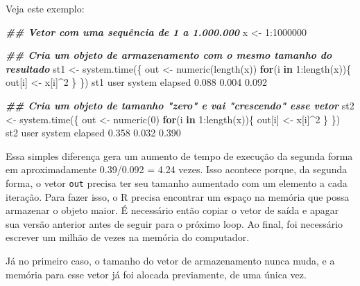 \documentclass[
  10pt,
  a4paper]{book}
\newenvironment{Shaded}{\begin{snugshade}}{\end{snugshade}}
\newcommand{\ControlFlowTok}[1]{\textcolor[rgb]{0.13,0.29,0.53}{\textbf{#1}}}
\newcommand{\DecValTok}[1]{\textcolor[rgb]{0.00,0.00,0.81}{#1}}
\newcommand{\DocumentationTok}[1]{\textcolor[rgb]{0.56,0.35,0.01}{\textbf{\textit{#1}}}}
\newcommand{\FloatTok}[1]{\textcolor[rgb]{0.00,0.00,0.81}{#1}}
\newcommand{\FunctionTok}[1]{\textcolor[rgb]{0.00,0.00,0.00}{#1}}
\newcommand{\NormalTok}[1]{#1}
\newcommand{\OtherTok}[1]{\textcolor[rgb]{0.56,0.35,0.01}{#1}}
\newcommand{\SpecialCharTok}[1]{\textcolor[rgb]{0.00,0.00,0.00}{#1}}
\begin{document}
Veja este exemplo:

\begin{Shaded}
\begin{Highlighting}[]
\DocumentationTok{\#\# Vetor com uma sequência de 1 a 1.000.000}
\NormalTok{x }\OtherTok{\textless{}{-}} \DecValTok{1}\SpecialCharTok{:}\DecValTok{1000000}

\DocumentationTok{\#\# Cria um objeto de armazenamento com o mesmo tamanho do resultado}
\NormalTok{st1 }\OtherTok{\textless{}{-}} \FunctionTok{system.time}\NormalTok{(\{}
\NormalTok{    out }\OtherTok{\textless{}{-}} \FunctionTok{numeric}\NormalTok{(}\FunctionTok{length}\NormalTok{(x))}
    \ControlFlowTok{for}\NormalTok{(i }\ControlFlowTok{in} \DecValTok{1}\SpecialCharTok{:}\FunctionTok{length}\NormalTok{(x))\{}
\NormalTok{        out[i] }\OtherTok{\textless{}{-}}\NormalTok{ x[i]}\SpecialCharTok{\^{}}\DecValTok{2}
\NormalTok{    \}}
\NormalTok{\})}
\NormalTok{st1}
\NormalTok{   user  system elapsed }
  \FloatTok{0.088}   \FloatTok{0.004}   \FloatTok{0.092} 

\DocumentationTok{\#\# Cria um objeto de tamanho "zero" e vai "crescendo" esse vetor}
\NormalTok{st2 }\OtherTok{\textless{}{-}} \FunctionTok{system.time}\NormalTok{(\{}
\NormalTok{    out }\OtherTok{\textless{}{-}} \FunctionTok{numeric}\NormalTok{(}\DecValTok{0}\NormalTok{)}
    \ControlFlowTok{for}\NormalTok{(i }\ControlFlowTok{in} \DecValTok{1}\SpecialCharTok{:}\FunctionTok{length}\NormalTok{(x))\{}
\NormalTok{        out[i] }\OtherTok{\textless{}{-}}\NormalTok{ x[i]}\SpecialCharTok{\^{}}\DecValTok{2}
\NormalTok{    \}}
\NormalTok{\})}
\NormalTok{st2}
\NormalTok{   user  system elapsed }
  \FloatTok{0.358}   \FloatTok{0.032}   \FloatTok{0.390} 
\end{Highlighting}
\end{Shaded}

Essa simples diferença gera um aumento de tempo de execução da segunda
forma em aproximadamente
0.39/0.092 = 4.24 vezes. Isso acontece
porque, da segunda forma, o vetor \texttt{out} precisa ter seu tamanho
aumentado com um elemento a cada iteração. Para fazer isso, o R precisa
encontrar um espaço na memória que possa armazenar o objeto maior. É
necessário então copiar o vetor de saída e apagar sua versão anterior
antes de seguir para o próximo loop. Ao final, foi necessário escrever
um milhão de vezes na memória do computador.

Já no primeiro caso, o tamanho do vetor de armazenamento nunca muda, e a
memória para esse vetor já foi alocada previamente, de uma única vez.
\end{document}
